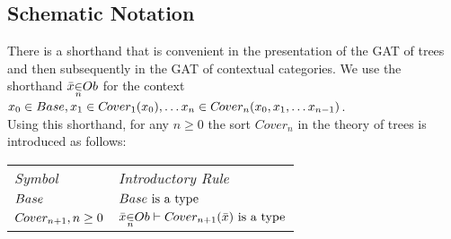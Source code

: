 \subsection {Schematic Notation}
\newcommand{\ft}[1]{
#1 \kern-6pt \raisebox{1.1ex}{$\leftrightline$} \kern-3pt \raisebox{.1ex}{$\downarrow$}}
\newcommand{\bbin}[1]{
\raisebox{-0.5em}{$\stackrel{\displaystyle{\in}} {\scriptstyle{#1}}$}
}
\newcommand{\ofTn}[3]{
\raisebox{0.25pt}{$\bar{#1}$} \bbin{#2} #3}


\newcommand{\genericOb}{Ob} %



There is a  shorthand that is convenient in the presentation  of the GAT of trees  and then subsequently in the GAT of contextual categories. We use the shorthand
$\ofTn{x}{n}{\genericOb}$ for the context $x_0 \in Base,x_1 \in C\kern-1pt over_{1}(x_0), \hdots x_n \in C\kern-1pt over_{n}(x_0,x_1,\hdots x_{n-1}) $. \\

\noindent Using this shorthand, for any $n \geq 0$ the sort $Cover_{n}$  in the theory of trees is introduced as follows: \\

\vspace{0.03cm} 
\begin{tabular}{>{\itshape}l l}
Symbol & \itshape{Introductory Rule} \\
$Base  $     & $Base\mbox{ is a type}$\\
$C\kern-1pt over_{n+1}, n \geq 0 $ & $\ofTn{x}{n}{\genericOb}    \tstyle \isT{\Si{n+1}(\bar{x})} $\\
\end{tabular} \\
\vspace{.1cm}  \\

